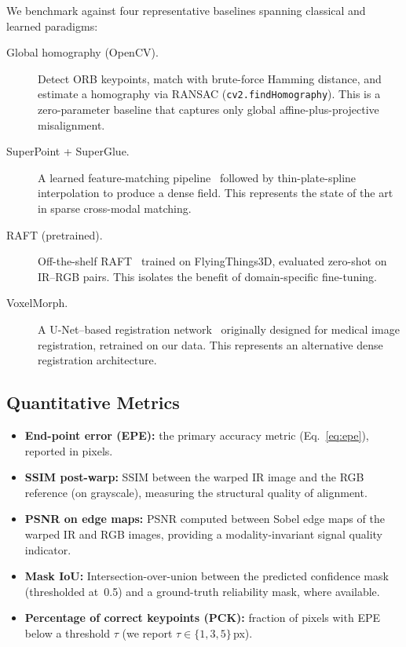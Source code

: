 We benchmark against four representative baselines spanning classical and
learned paradigms:

\begin{description}
  \item[Global homography (OpenCV).] Detect ORB keypoints, match with
    brute-force Hamming distance, and estimate a homography via RANSAC
    (\texttt{cv2.findHomography}).  This is a zero-parameter baseline that
    captures only global affine-plus-projective misalignment.
  \item[SuperPoint + SuperGlue.] A learned feature-matching
    pipeline~\cite{detone2018superpoint,sarlin2020superglue} followed by
    thin-plate-spline interpolation to produce a dense field.  This
    represents the state of the art in sparse cross-modal matching.
  \item[RAFT (pretrained).] Off-the-shelf RAFT~\cite{teed2020raft} trained
    on FlyingThings3D, evaluated zero-shot on IR--RGB pairs.  This isolates
    the benefit of domain-specific fine-tuning.
  \item[VoxelMorph.] A U-Net--based registration
    network~\cite{balakrishnan2019voxelmorph} originally designed for medical
    image registration, retrained on our data.  This represents an
    alternative dense registration architecture.
\end{description}

\subsection{Quantitative Metrics}
\label{ssec:metrics}

\begin{itemize}
  \item \textbf{End-point error (EPE):} the primary accuracy metric
        (Eq.~\ref{eq:epe}), reported in pixels.
  \item \textbf{SSIM post-warp:} SSIM between the warped IR image and the
        RGB reference (on grayscale), measuring the structural quality of
        alignment.
  \item \textbf{PSNR on edge maps:} PSNR computed between Sobel edge
        maps of the warped IR and RGB images, providing a
        modality-invariant signal quality indicator.
  \item \textbf{Mask IoU:} Intersection-over-union between the predicted
        confidence mask (thresholded at~0.5) and a ground-truth reliability
        mask, where available.
  \item \textbf{Percentage of correct keypoints (PCK):} fraction of pixels
        with EPE below a threshold $\tau$ (we report $\tau \in
        \{1, 3, 5\}$\,px).
\end{itemize}

